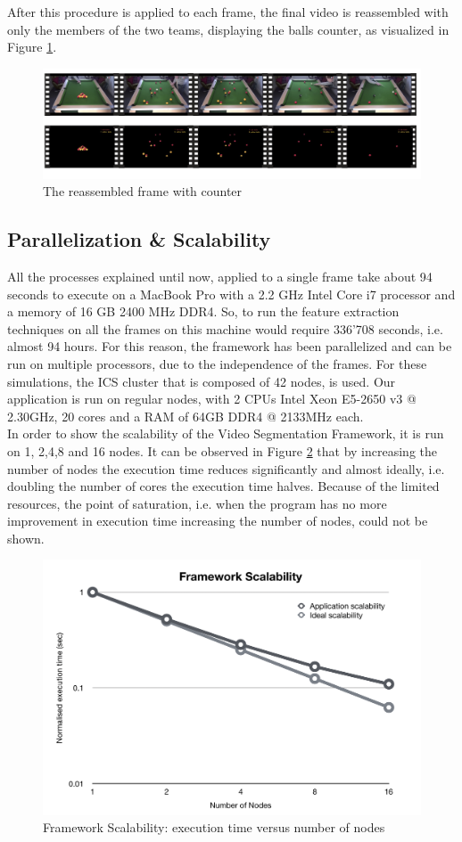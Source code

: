 \documentclass{usiinftr}
\begin{document}
\noindent
After this procedure is applied to each frame, the final video is reassembled with only the members of the two teams, displaying the balls counter, as visualized in Figure \ref{fig:10}. 
\begin{figure}[h]
	\centering
	\includegraphics[width=1\linewidth]{./img/frames}
	\caption{The reassembled frame with counter}
	\label{fig:10}
\end{figure}


\newpage
\subsection{Parallelization \& Scalability}
All the processes explained until now, applied to a single frame take about 94 seconds to execute on a MacBook Pro with a 2.2 GHz Intel Core i7 processor and a memory of 16 GB 2400 MHz DDR4. So, to run the feature extraction techniques on all the frames on this machine would require 336'708 seconds, i.e. almost 94 hours. For this reason, the framework has been parallelized and can be run on multiple processors, due to the independence of the frames. For these simulations, the ICS cluster that is composed of 42 nodes, is used. Our application is run on regular nodes, with 2 CPUs Intel Xeon E5-2650 v3 @ 2.30GHz, 20 cores and a RAM of 64GB DDR4 @ 2133MHz each. \\
In order to show the scalability of the Video Segmentation Framework, it is run on 1, 2,4,8 and 16 nodes. It can be observed in Figure \ref{fig:9} that by increasing the number of nodes the execution time reduces significantly and almost ideally, i.e. doubling the number of cores the execution time halves. Because of the limited resources, the point of saturation, i.e. when the program has no more improvement in execution time increasing the number of nodes, could not be shown.

\begin{figure}[h]
	\centering
	\includegraphics[width=0.8\linewidth]{img/scalability}
	\caption{Framework Scalability: execution time versus number of nodes}
	\label{fig:9}
\end{figure}
\end{document}
